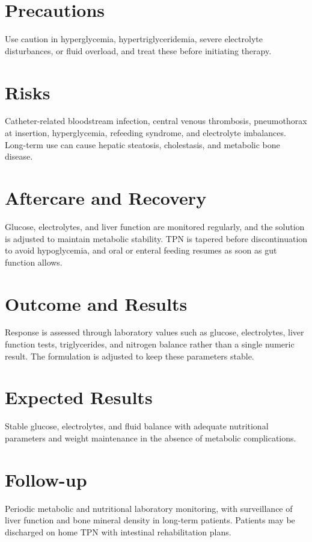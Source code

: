 \section*{Precautions}
Use caution in hyperglycemia, hypertriglyceridemia, severe electrolyte disturbances, or fluid overload, and treat these before initiating therapy.

\section*{Risks}
Catheter-related bloodstream infection, central venous thrombosis, pneumothorax at insertion, hyperglycemia, refeeding syndrome, and electrolyte imbalances. Long-term use can cause hepatic steatosis, cholestasis, and metabolic bone disease.

\section*{Aftercare and Recovery}
Glucose, electrolytes, and liver function are monitored regularly, and the solution is adjusted to maintain metabolic stability. TPN is tapered before discontinuation to avoid hypoglycemia, and oral or enteral feeding resumes as soon as gut function allows.

\section*{Outcome and Results}
Response is assessed through laboratory values such as glucose, electrolytes, liver function tests, triglycerides, and nitrogen balance rather than a single numeric result. The formulation is adjusted to keep these parameters stable.

\section*{Expected Results}
Stable glucose, electrolytes, and fluid balance with adequate nutritional parameters and weight maintenance in the absence of metabolic complications.

\section*{Follow-up}
Periodic metabolic and nutritional laboratory monitoring, with surveillance of liver function and bone mineral density in long-term patients. Patients may be discharged on home TPN with intestinal rehabilitation plans.

